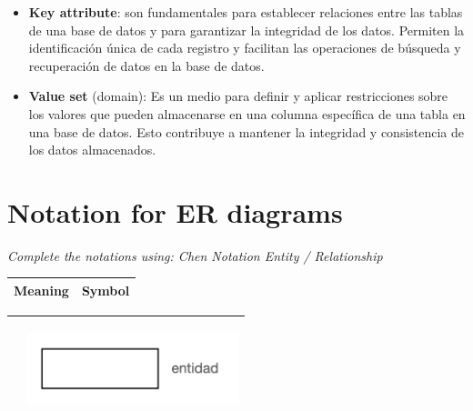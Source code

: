 \documentclass[letterpaper, 12pt]{report}
\begin{document}
\begin{itemize}[label=$\triangleright$]
	\item \textbf{Key attribute}: son fundamentales para establecer
	      relaciones entre las tablas de una base de datos y para garantizar
	      la integridad de los datos. Permiten la identificación única de cada
	      registro y facilitan las operaciones de búsqueda y recuperación de
	      datos en la base de datos.

	\item \textbf{Value set} (domain): Es un medio para definir y
	      aplicar restricciones sobre los valores que pueden almacenarse
	      en una columna específica de una tabla en una base de datos. Esto
	      contribuye a mantener la integridad y consistencia de los datos
	      almacenados.
\end{itemize}

\section{Notation for ER diagrams}

\textit{Complete the notations using: Chen Notation \@{} Entity / Relationship}

\begin{table}[H]
	\begin{center}
		\begin{tabularx}{.8\linewidth}{|>{\centering\arraybackslash}X|>{\centering\arraybackslash}X|}
			\hline
			\textbf{Meaning} & \textbf{Symbol} \\\hline
		\end{tabularx}
	\end{center}
\end{table}

\vspace{-1.2cm}

\begin{table}[H]
	\begin{center}
		\begin{tabularx}{.8\linewidth}{|>{\centering\arraybackslash}X|>{\centering\arraybackslash}X|}
			\hline
			\multirow{4}{*}{Entity} & \begin{center} \includegraphics[width=.9\linewidth]{./Images/Entidad.png}  \end{center} \\\hline
		\end{tabularx}
	\end{center}
\end{table}
\end{document}
